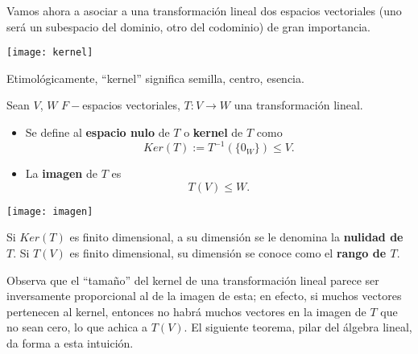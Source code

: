 Vamos ahora a asociar a una transformación
lineal dos espacios vectoriales (uno será un subespacio del
dominio, otro del codominio) de gran importancia.
\begin{defi}
\begin{marginfigure}
\texttt{[image: kernel]} 
		\caption{Etimológicamente, ``kernel'' significa semilla,
		centro, esencia.}
\end{marginfigure}
Sean $V$, $W$ $F-$espacios vectoriales, $T: V \longrightarrow W$
una transformación lineal.  
\begin{itemize}
	\item Se define al \textbf{espacio nulo} de $T$
	o \textbf{kernel} de $T$ como 
	\begin{equation}
		\label{eq: kernel de T}
		Ker(T) := T^{-1}(\{ 0_{W} \}) \leq V.
	\end{equation}
	\item La \textbf{imagen} de $T$
	es \begin{equation}
		\label{eq: rango de T}
		T(V) \leq W.
	\end{equation}
\end{itemize}
\begin{marginfigure}
\texttt{[image: imagen]} 
\end{marginfigure}
Si $Ker(T)$ es finito dimensional, a su dimensión se le denomina
la \textbf{nulidad de $T$}. Si $T(V)$ es finito dimensional,
su dimensión se conoce como el \textbf{rango de $T$}.
\end{defi}

Observa que el ``tamaño'' del kernel de una transformación lineal
parece ser inversamente proporcional al de la imagen de esta;
en efecto, si muchos vectores pertenecen al kernel, entonces
no habrá muchos vectores en la imagen de $T$ que no sean cero,
lo que achica a $T(V)$. El siguiente teorema, pilar del 
álgebra lineal, da forma a esta intuición.

